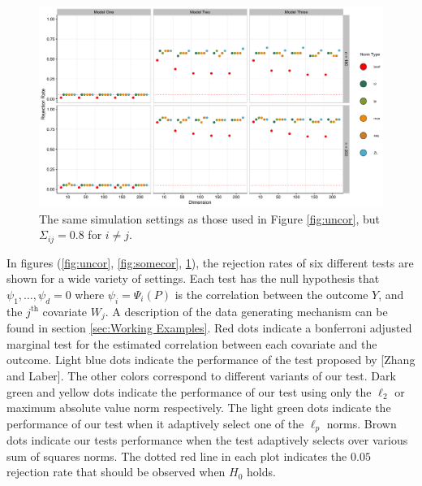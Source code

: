 \documentclass{article}
\begin{document}
\begin{figure}[]
	\centering
\includegraphics[width = \linewidth]{lots_cor.jpg}
	\caption{The same simulation settings as those used in Figure \ref{fig:uncor}, but $\Sigma_{ij} = 0.8$ for $i \neq j$.}
	\label{fig:lotscor}
\end{figure}


In figures (\ref{fig:uncor}, \ref{fig:somecor}, \ref{fig:lotscor}), the rejection rates of six different tests are shown for a wide variety of settings. Each test has the null hypothesis that $\psi_1, \dots, \psi_d = 0$ where $\psi_i = \Psi_i(P)$ is the correlation between the outcome $Y$, and the $j^\text{th}$ covariate $W_j$. A description of the data generating mechanism can be found in section \ref{sec:Working Examples}.  Red dots indicate a bonferroni adjusted marginal test for the estimated correlation between each covariate and the outcome. Light blue dots indicate the performance of the test proposed by [Zhang and Laber]. The other colors correspond to different variants of our test. Dark green and yellow dots indicate the performance of our test using only the $\ell_2$ or maximum absolute value norm respectively.  The light green dots indicate the performance of our test when it adaptively select one of the $\ell_p$ norms. Brown dots indicate our tests performance when the test adaptively selects over various sum of squares norms. The dotted red line in each plot indicates the $0.05$ rejection rate that should be observed when $H_0$ holds.  
\end{document}
